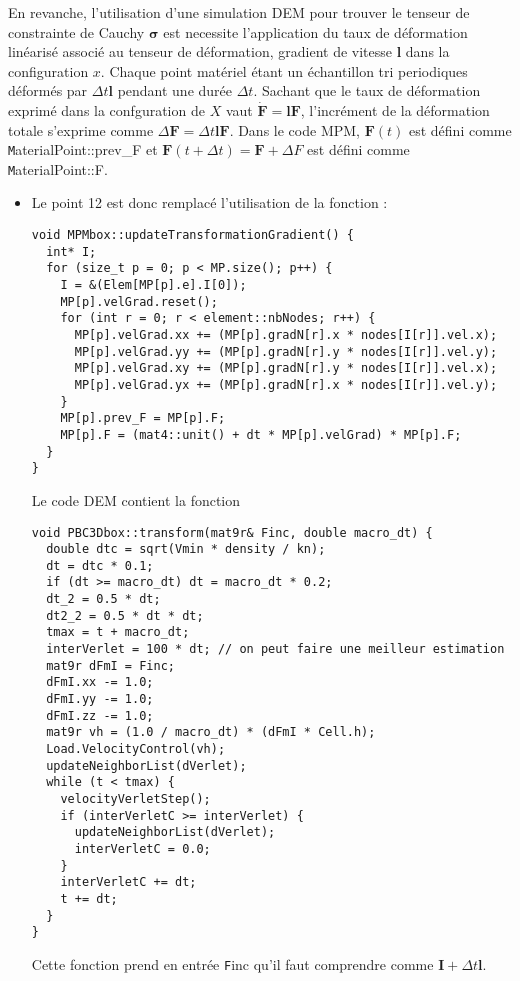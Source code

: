 \documentclass[12pt]{article}
\begin{document}
En revanche, l'utilisation d'une simulation DEM pour trouver le tenseur de constrainte de Cauchy $\boldsymbol \sigma$ est necessite l'application
du taux de déformation linéarisé associé au tenseur de déformation, gradient de vitesse $\boldsymbol l$ dans la configuration $x$. 
Chaque point matériel étant  un échantillon tri periodiques déformés par $\Delta t\boldsymbol l$ pendant une durée $\Delta t$.
Sachant que le taux de déformation exprimé dans la confguration de $X$ vaut $\boldsymbol{\dot F}=\boldsymbol l\boldsymbol F$, 
l'incrément de la déformation totale s'exprime comme $\Delta \boldsymbol F=\Delta t\boldsymbol l \boldsymbol F$. 
Dans le code MPM, $\boldsymbol F(t)$ est défini comme {\texttt MaterialPoint::prev\_F} et 
$\boldsymbol F(t+\Delta t)=\boldsymbol F+ \Delta F$ est défini comme {\texttt MaterialPoint::F}.
\begin{itemize}
\item
Le point 12 est donc remplacé l'utilisation de la fonction : 
\begin{verbatim}
void MPMbox::updateTransformationGradient() {
  int* I;
  for (size_t p = 0; p < MP.size(); p++) {
    I = &(Elem[MP[p].e].I[0]);
    MP[p].velGrad.reset();
    for (int r = 0; r < element::nbNodes; r++) {
      MP[p].velGrad.xx += (MP[p].gradN[r].x * nodes[I[r]].vel.x);
      MP[p].velGrad.yy += (MP[p].gradN[r].y * nodes[I[r]].vel.y);
      MP[p].velGrad.xy += (MP[p].gradN[r].y * nodes[I[r]].vel.x);
      MP[p].velGrad.yx += (MP[p].gradN[r].x * nodes[I[r]].vel.y);
    }
    MP[p].prev_F = MP[p].F;
    MP[p].F = (mat4::unit() + dt * MP[p].velGrad) * MP[p].F;
  }
}
\end{verbatim}
Le code DEM contient la fonction
\begin{verbatim}
void PBC3Dbox::transform(mat9r& Finc, double macro_dt) {
  double dtc = sqrt(Vmin * density / kn);
  dt = dtc * 0.1;
  if (dt >= macro_dt) dt = macro_dt * 0.2;
  dt_2 = 0.5 * dt;
  dt2_2 = 0.5 * dt * dt;
  tmax = t + macro_dt;
  interVerlet = 100 * dt; // on peut faire une meilleur estimation
  mat9r dFmI = Finc;
  dFmI.xx -= 1.0;
  dFmI.yy -= 1.0;
  dFmI.zz -= 1.0;
  mat9r vh = (1.0 / macro_dt) * (dFmI * Cell.h);
  Load.VelocityControl(vh);
  updateNeighborList(dVerlet);
  while (t < tmax) {
    velocityVerletStep();
    if (interVerletC >= interVerlet) {
      updateNeighborList(dVerlet);
      interVerletC = 0.0;
    }
    interVerletC += dt;
    t += dt;
  }
}
\end{verbatim} 
Cette fonction prend en entrée {\texttt Finc} qu'il faut comprendre comme $\boldsymbol I+\Delta t \boldsymbol l$.

\end{itemize}
\end{document}
